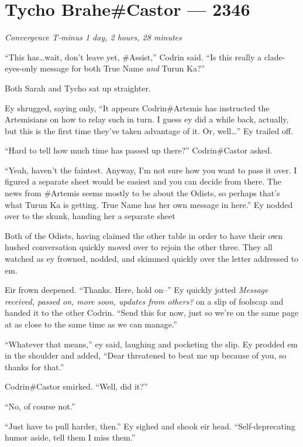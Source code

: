 \hypertarget{tycho-brahecastor-2346}{%
\chapter{Tycho Brahe\#Castor — 2346}}

\begin{center}
\emph{Convergence T-minus 1 day, 2 hours, 28 minutes}
\end{center}

\noindent ``This has\ldots wait, don't leave yet, \#Assist,'' Codrin said. ``Is this really a clade-eyes-only message for both True Name \emph{and} Turun Ka?''

Both Sarah and Tycho sat up straighter.

Ey shrugged, saying only, ``It appears Codrin\#Artemis has instructed the Artemisians on how to relay such in turn. I guess ey did a while back, actually, but this is the first time they've taken advantage of it. Or, well\ldots{}'' Ey trailed off.

``Hard to tell how much time has passed up there?'' Codrin\#Castor asked.

``Yeah, haven't the faintest. Anyway, I'm not sure how you want to pass it over. I figured a separate sheet would be easiest and you can decide from there. The news from \#Artemis seems mostly to be about the Odists, so perhaps that's what Turun Ka is getting. True Name has her own message in here.'' Ey nodded over to the skunk, handing her a separate sheet

Both of the Odists, having claimed the other table in order to have their own hushed conversation quickly moved over to rejoin the other three. They all watched as ey frowned, nodded, and skimmed quickly over the letter addressed to em.

Eir frown deepened. ``Thanks. Here, hold on--'' Ey quickly jotted \emph{Message received, passed on, more soon, updates from others?} on a slip of foolscap and handed it to the other Codrin. ``Send this for now, just so we're on the same page at as close to the same time as we can manage.''

``Whatever that means,'' ey said, laughing and pocketing the slip. Ey prodded em in the shoulder and added, ``Dear threatened to beat me up because of you, so thanks for that.''

Codrin\#Castor smirked. ``Well, did it?''

``No, of course not.''

``Just have to pull harder, then.'' Ey sighed and shook eir head. ``Self-deprecating humor aside, tell them I miss them.''

